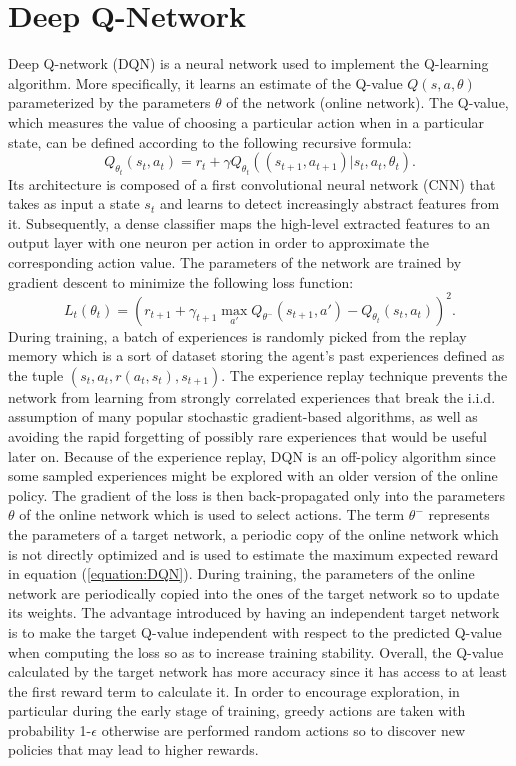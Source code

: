 \section{Deep Q-Network}
Deep Q-network (DQN) \cite{mnih2013playing} is a neural network used to implement the Q-learning algorithm. More specifically, it learns an estimate of the Q-value \(Q(s,a,\theta)\) parameterized by the parameters \(\theta\) of the network (online network). The Q-value, which measures the value of choosing a particular action when in a particular state, can be defined according to the following recursive formula:
\begin{equation} \label{equation:Qvalue}
Q_{\theta_t}(s_{t},a_{t})=r_{t}+\gamma Q_{\theta_{t}} ((s_{t+1},a_{t+1})|s_{t},a_{t},\theta_{t}).
\end{equation}
Its architecture is composed of a first convolutional neural network (CNN) that takes as input a state \(s_t\) and learns to detect increasingly abstract features from it. Subsequently, a dense classifier maps the high-level extracted features to an output layer with one neuron per action in order to approximate the corresponding action value. The parameters of the network are trained by gradient descent to minimize the following loss function:
\begin{equation} \label{equation:DQN}
L_t(\theta_t)=(r_{t+1}+\gamma_{t+1}\max_{a'}Q_{\theta^{-}}(s_{t+1},a')-Q_{\theta_t}(s_t,a_t))^2.
\end{equation}
During training, a batch of experiences is randomly picked from the replay memory which is a sort of dataset storing the agent’s past experiences defined as the tuple \((s_t, a_t, r(a_t,s_t), s_{t+1})\). The experience replay technique prevents the network from learning from strongly correlated experiences that break the i.i.d. assumption of many popular stochastic gradient-based algorithms, as well as avoiding the rapid forgetting of possibly rare experiences that would be useful later on. Because of the experience replay, DQN is an off-policy algorithm since some sampled experiences might be explored with an older version of the online policy. The gradient of the loss is then back-propagated only into the parameters \(\theta\) of the online network which is used to select actions. The term \(\theta^-\) represents the parameters of a target network, a periodic copy of the online network which is not directly optimized and is used to estimate the maximum expected reward in equation (\ref{equation:DQN}). During training, the parameters of the online network are periodically copied into the ones of the target network so to update its weights. The advantage introduced by having an independent target network is to make the target Q-value independent with respect to the predicted Q-value when computing the loss so as to increase training stability. Overall, the Q-value calculated by the target network has more accuracy since it has access to at least the first reward term to calculate it. In order to encourage exploration, in particular during the early stage of training, greedy actions are taken with probability 1-\(\epsilon\) otherwise are performed random actions so to discover new policies that may lead to higher rewards.

